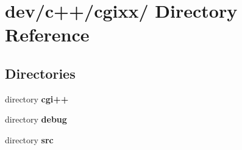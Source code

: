 \section{dev/c++/cgixx/ Directory Reference}
\label{dir_3aa8ac9089e45afce99fd475e06237c5}
\subsection*{Directories}
\begin{CompactItemize}
\item 
directory {\bf cgi++}
\item 
directory {\bf debug}
\item 
directory {\bf src}
\end{CompactItemize}
